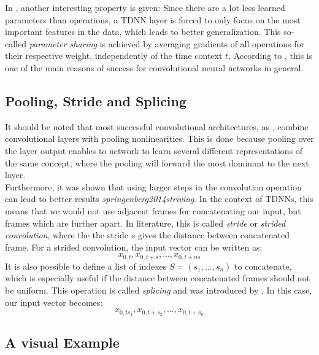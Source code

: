 In \cite{waibel1990phoneme}, another interesting property is given: Since there are a lot less learned parameters than operations, a TDNN layer is forced to only focus on the most important features in the data, which leads to better generalization. This so-called \textit{parameter sharing} is achieved by averaging gradients of all operations for their respective weight, independently of the time context $t$. According to \cite{Goodfellow-et-al-2016}, this is one of the main reasons of success for convolutional neural networks in general. 

\subsection{Pooling, Stride and Splicing}

It should be noted that most successful convolutional architectures, as \cite{krizhevsky2012imagenet}, combine convolutional layers with pooling nonlinearities. This is done because pooling over the layer output enables to network to learn several different representations of the same concept, where the pooling will forward the most dominant to the next layer. \\
Furthermore, it was shown that using larger steps in the convolution operation can lead to better results \textit{springenberg2014striving}. In the context of TDNNs, this means that we would not use adjacent frames for concatenating our input, but frames which are further apart. In literature, this is called \textit{stride} or \textit{strided convolution}, where the the stride $s$ gives the distance between concatenated frame. For a strided convolution, the input vector can be written as:
\[
x_{0,t}, x_{0,t + s}, ..., x_{0,t + ns}
\] 
It is also possible to define a list of indexes $S = (s_1, ..., s_n)$ to concatenate, which is especially useful if the distance between concatenated frames should not be uniform. This operation is called \textit{splicing} and was introduced by \cite{peddinti2015jhu}. In this case, our input vector becomes: 
\[
x_{0,ts_1}, x_{0,t + s_2}, ..., x_{0,t + s_n}
\] 

\subsection{A visual Example}


